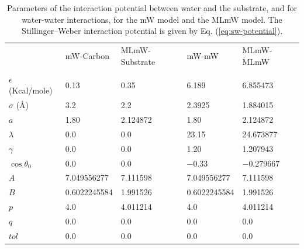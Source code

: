 \documentclass[journal abbreviation, manuscript]{copernicus}
\begin{document}
\appendixtables
\begin{table}
\begin{tabular}{ |p{1.95cm}||p{3.0cm}|p{3.0cm}|p{3.0cm}|p{3.0cm}|  }
 \hline
 & mW-Carbon  & MLmW-Substrate & mW-mW  &  MLmW-MLmW \\
& \citep{lupi2014}  & & \citep{molinero2009} &  \citep{chan2019} \\
 \hline
 $\epsilon$ (Kcal/mole)    & 0.13          & 0.35      & 6.189         & 6.855473  \\
 $\sigma$ (\AA{})      & 3.2           & 2.2       & 2.3925        & 1.884015\\
 $a$                      & 1.80          & 2.124872  & 1.80          & 2.124872  \\
 $\lambda$                 & 0.0           & 0.0       & 23.15         & 24.673877 \\
 $\gamma$                  & 0.0           & 0.0       & 1.20          & 1.207943  \\
 $\cos\theta_0$              & 0.0           & 0.0       & $-0.33$         & $-0.279667$ \\
 $A$                      & 7.049556277   & 7.111598  & 7.049556277   & 7.111598  \\
 $B$                      & 0.6022245584  & 1.991526  & 0.6022245584  & 1.991526  \\
 $p$                      & 4.0           & 4.011214  & 4.0           & 4.011214  \\
 $q$                      & 0.0           & 0.0       & 0.0           & 0.0       \\
 $tol$                    & 0.0           & 0.0       & 0.0           & 0.0       \\
 \hline
\end{tabular}
\caption{Parameters of the interaction potential between water and the substrate, and for water-water interactions, for the mW model and the MLmW model. The Stillinger--Weber interaction potential is given by Eq. (\ref{eq:sw-potential}). \label{Tab:potentials}}
\end{table}



\end{document}
